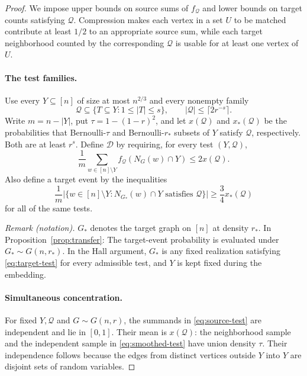 \documentclass[11pt]{article}
\theoremstyle{remark}
\numberwithin{equation}{section}
\newcommand{\calD}{\mathcal D}
\newcommand{\calQ}{\mathcal Q}
\begin{document}
\begin{proof}
We impose upper bounds on source sums of $f_{\calQ}$ and lower
bounds on target counts satisfying $\calQ$. Compression makes
each vertex in a set $U$ to be matched contribute at least $1/2$
to an appropriate source sum, while each target neighborhood
counted by the corresponding $\calQ$ is usable for at least one
vertex of $U$.

\paragraph{The test families.}
Use every $Y\subseteq[n]$ of size at most $n^{2/3}$ and every
nonempty family
\[
 \calQ\subseteq\{T\subseteq Y:1\leq|T|\leq s\},
 \qquad |\calQ|\leq\lceil2r^{-s}\rceil.
\]
Write $m=n-|Y|$, put $\tau=1-(1-r)^2$, and let
$x(\calQ)$ and $x_*(\calQ)$ be the probabilities that
Bernoulli-$\tau$ and Bernoulli-$r_*$ subsets of $Y$ satisfy
$\calQ$, respectively. Both are at least $r^s$.
Define $\calD$ by requiring, for every test $(Y,\calQ)$,
\begin{equation}\label{eq:source-test}
 \frac1m\sum_{w\in[n]\setminus Y}
 f_{\calQ}(N_G(w)\cap Y)\leq2x(\calQ).
\end{equation}
Also define a target event by the inequalities
\begin{equation}\label{eq:target-test}
 \frac1m\bigl|\{w\in[n]\setminus Y:
       N_{G_*}(w)\cap Y\text{ satisfies }\calQ\}\bigr|
 \geq\frac34x_*(\calQ)
\end{equation}
for all of the same tests.

\noindent\textit{Remark (notation).} $G_*$ denotes the target graph on $[n]$ at density $r_*$. In Proposition~\ref{prop:transfer}: The target-event probability is evaluated under $G_*\sim G(n,r_*)$. In the Hall argument, $G_*$ is any fixed realization satisfying \eqref{eq:target-test} for every admissible test, and $Y$ is kept fixed during the embedding.


\paragraph{Simultaneous concentration.}
For fixed $Y,\calQ$ and $G\sim G(n,r)$, the summands in
\eqref{eq:source-test} are independent and lie in $[0,1]$.
Their mean is $x(\calQ)$: the neighborhood sample and the
independent sample in \eqref{eq:smoothed-test} have union
density $\tau$. Their independence follows because the edges
from distinct vertices outside $Y$ into $Y$ are disjoint sets
of random variables.


\end{proof}
\end{document}
